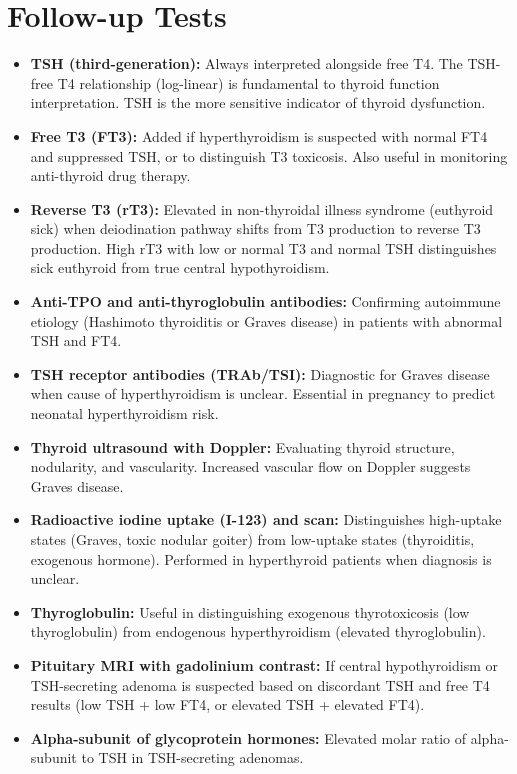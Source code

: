 \section*{Follow-up Tests}
\begin{itemize}
  \item \textbf{TSH (third-generation):} Always interpreted alongside free T4. The TSH-free T4 relationship (log-linear) is fundamental to thyroid function interpretation. TSH is the more sensitive indicator of thyroid dysfunction.
  \item \textbf{Free T3 (FT3):} Added if hyperthyroidism is suspected with normal FT4 and suppressed TSH, or to distinguish T3 toxicosis. Also useful in monitoring anti-thyroid drug therapy.
  \item \textbf{Reverse T3 (rT3):} Elevated in non-thyroidal illness syndrome (euthyroid sick) when deiodination pathway shifts from T3 production to reverse T3 production. High rT3 with low or normal T3 and normal TSH distinguishes sick euthyroid from true central hypothyroidism.
  \item \textbf{Anti-TPO and anti-thyroglobulin antibodies:} Confirming autoimmune etiology (Hashimoto thyroiditis or Graves disease) in patients with abnormal TSH and FT4.
  \item \textbf{TSH receptor antibodies (TRAb/TSI):} Diagnostic for Graves disease when cause of hyperthyroidism is unclear. Essential in pregnancy to predict neonatal hyperthyroidism risk.
  \item \textbf{Thyroid ultrasound with Doppler:} Evaluating thyroid structure, nodularity, and vascularity. Increased vascular flow on Doppler suggests Graves disease.
  \item \textbf{Radioactive iodine uptake (I-123) and scan:} Distinguishes high-uptake states (Graves, toxic nodular goiter) from low-uptake states (thyroiditis, exogenous hormone). Performed in hyperthyroid patients when diagnosis is unclear.
  \item \textbf{Thyroglobulin:} Useful in distinguishing exogenous thyrotoxicosis (low thyroglobulin) from endogenous hyperthyroidism (elevated thyroglobulin).
  \item \textbf{Pituitary MRI with gadolinium contrast:} If central hypothyroidism or TSH-secreting adenoma is suspected based on discordant TSH and free T4 results (low TSH + low FT4, or elevated TSH + elevated FT4).
  \item \textbf{Alpha-subunit of glycoprotein hormones:} Elevated molar ratio of alpha-subunit to TSH in TSH-secreting adenomas.
\end{itemize}

